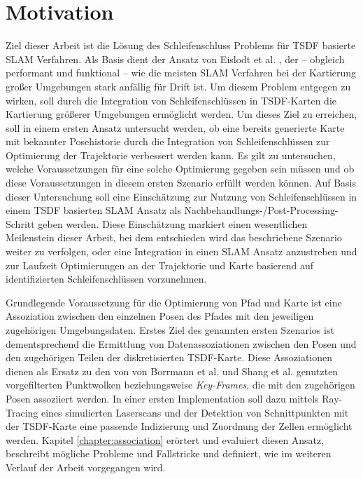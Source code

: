 \section{Motivation}

Ziel dieser Arbeit ist die Lösung des Schleifenschluss Problems für TSDF basierte SLAM Verfahren.
Als Basis dient der Ansatz von Eislodt et al. \cite{HATSDF}, der -- obgleich performant und funktional -- wie die meisten SLAM Verfahren bei der Kartierung großer Umgebungen stark anfällig für Drift ist. Um diesem Problem entgegen zu wirken, soll durch die Integration von Schleifenschlüssen in TSDF-Karten die Kartierung größerer Umgebungen ermöglicht werden.
Um dieses Ziel zu erreichen, soll in einem ersten Ansatz untersucht werden, ob eine bereits generierte Karte mit bekannter Posehistorie durch die Integration von Schleifenschlüssen zur Optimierung der Trajektorie verbessert werden kann.
Es gilt zu untersuchen, welche Voraussetzungen für eine solche Optimierung gegeben sein müssen und ob diese Voraussetzungen in diesem ersten Szenario erfüllt werden können.
Auf Basis dieser Untersuchung soll eine Einschätzung zur Nutzung von Schleifenschlüssen in einem TSDF basierten SLAM Ansatz als Nachbehandlungs-/Post-Processing-Schritt geben werden.
Diese Einschätzung markiert einen wesentlichen Meilenstein dieser Arbeit, bei dem entschieden wird das beschriebene Szenario weiter zu verfolgen, oder eine Integration in einen SLAM Ansatz anzustreben und zur Laufzeit Optimierungen an der Trajektorie und Karte basierend auf identifizierten Schleifenschlüssen vorzunehmen.

Grundlegende Voraussetzung für die Optimierung von Pfad und Karte ist eine Assoziation zwischen den einzelnen Posen des Pfades mit den jeweiligen zugehörigen Umgebungsdaten.
Erstes Ziel des genannten ersten Szenarios ist dementsprechend die Ermittlung von Datenassoziationen zwischen den Posen und den zugehörigen Teilen der diskretisierten TSDF-Karte.
Diese Assoziationen dienen als Ersatz zu den von von Borrmann et al. \cite{borrmann2008globally} und Shang et al. \cite{shan2020lio} genutzten vorgefilterten Punktwolken beziehungsweise \emph{Key-Frames}, die mit den zugehörigen Posen assoziiert werden.
In einer ersten Implementation soll dazu mittels Ray-Tracing eines simulierten Laserscans und der Detektion von Schnittpunkten mit der TSDF-Karte eine passende Indizierung und Zuordnung der Zellen ermöglicht werden.
Kapitel \ref{chapter:association} erörtert und evaluiert diesen Ansatz, beschreibt mögliche Probleme und Fallstricke und definiert, wie im weiteren Verlauf der Arbeit vorgegangen wird.

